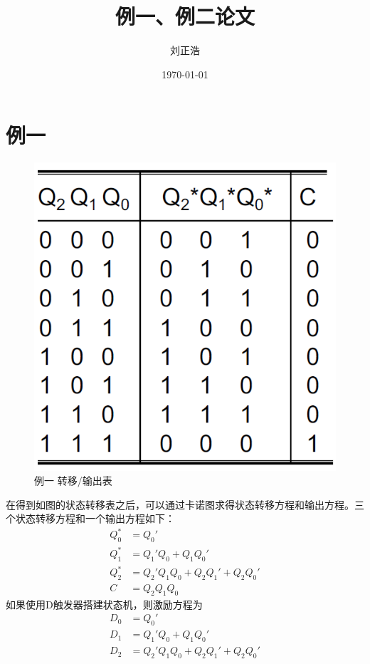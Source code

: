 \documentclass[a4paper]{article}
\title{\heiti\zihao{2} 例一、例二论文}
\author{\songti 刘正浩}
\date{\today}
\begin{document}
	\maketitle
	\thispagestyle{empty}


\tableofcontents

	\section{例一}
		\begin{figure}[htbp]
			\centering
			\includegraphics[scale=0.3]{例一转移输出表.png}
			\caption{例一 转移/输出表}
		\end{figure}
		在得到如图的状态转移表之后，可以通过卡诺图求得状态转移方程和输出方程。三个状态转移方程和一个输出方程如下：
		\begin{align}
			Q_0^* &= Q_0'\\  
			Q_1^* &= Q_1' Q_0 + Q_1 Q_0'\\  
			Q_2^* &= Q_2' Q_1 Q_0 + Q_2 Q_1' + Q_2 Q_0'\\
			C &= Q_2 Q_1 Q_0
		\end{align}
		如果使用D触发器搭建状态机，则激励方程为
		\begin{align}
			D_0 &= Q_0'\\  
			D_1 &= Q_1' Q_0 + Q_1 Q_0'\\  
			D_2 &= Q_2' Q_1 Q_0 + Q_2 Q_1' + Q_2 Q_0'
		\end{align}
\end{document}
